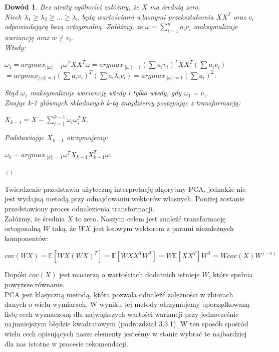 \documentclass[12pt,a4paper]{report}
\newtheorem{dw}{Dowód}
\begin{document}
\begin{dw}
Bez utraty ogólności załóżmy, że $X$ ma średnią zero.
\\Niech $\lambda_1\geq\lambda_2\geq...\geq\lambda_n$ będą wartościami własnymi przekształcenia $XX^T$ oraz $v_i$ odpowiadającą bazą ortogonalną. Załóżmy, że $\omega = \sum_{i=1}^n a_iv_i$ maksymalizuje wariancję oraz $w\neq v_i$.
\\Wtedy:
\begin{center}
$\omega_1 = argmax_{||\omega||=1}\omega^TXX^T\omega = argmax_{||\omega||=1}(\sum a_iv_i)^TXX^T(\sum a_iv_i)$
\\$ = argmax_{||\omega||=1}(\sum a_iv_i)^T(\sum a_i\lambda_iv_i)= argmax_{||\omega||=1}(\sum a_i)^2$.
\end{center}
Stąd $\omega_1$ maksymalizuje wariancję wtedy i tylko wtedy, gdy $\omega_1=v_1$. 
\\Znając k-1 głównych składowych k-tą znajdziemy postępując z transformacją:
\begin{center}
$X_{k-1} = X - \sum_{i=1}^{k-1}\omega_i\omega_i^TX$.
\end{center}
Podstawiając $X_{k-1}$ otrzymujemy:
\begin{center}
$\omega_k = argmax_{||x||=1}\omega^TX_{k-1}X_{k-1}^T\omega$.
\end{center}
\end{dw}
\begin{flushright}
$\Box$
\end{flushright}
Twierdzenie przedstawia użyteczną interpretację algorytmy PCA, jednakże nie jest wydajną metodą przy odnajdowaniu wektorów własnych. Poniżej zostanie przedstawiony proces odnalezienia transformacji.
\\Załóżmy, że średnia $X$ to zero. Naszym celem jest znaleźć transformację ortogonalną $W$ taką, że $WX$ jest losowym wektorem z parami niezależnych komponentów:
\begin{center}
$cov(WX) = \mathbb{E}[WX(WX)^T]
= \mathbb{E}[WX X^T W^T]
=W \mathbb{E}[XX^T]W^T
=W cov(X)W^{(-1)}$
\end{center}
Dopóki $cov(X)$ jest macierzą o wartościach dodatnich istnieje $W$, które spełnia powyższe równanie.
\\PCA jest klasyczną metodą, która pozwala odnaleźć zależności w zbiorach danych o wielu wymiarach. W wyniku tej metody otrzymujemy uporządkowaną listę cech wyznaczoną dla największych wartości wariancji przy jednocześnie najmniejszym błędzie kwadratowym (podrozdział 3.3.1). W ten sposób spośród wielu cech opisujących nasze elementy jesteśmy w stanie wybrać te najbardziej dla nas istotne w procesie rekomendacji.
\end{document}
